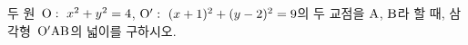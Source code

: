 두 원~$\mathrm{O}:\ x^2+y^2=4$, $\mathrm{O}':\ (x+1)^2+(y-2)^2=9$의 두 교점을 $\mathrm{A}$, $\mathrm{B}$라 할 때, 삼각형~$\mathrm{O'AB}$의 넓이를 구하시오. 
